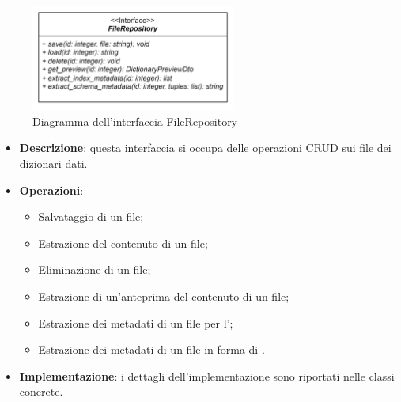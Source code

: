 \label{FileRepository}
\begin{figure}[H]
    \centering
    \includegraphics[width=0.6\textwidth]{assets/Backend/file_repository.png}
    \caption{Diagramma dell'interfaccia FileRepository}
  \end{figure}
\begin{itemize}
  \item \textbf{Descrizione}: questa interfaccia si occupa delle operazioni CRUD sui file dei dizionari dati.
  \item \textbf{Operazioni}: 
    \begin{itemize}
      \item Salvataggio di un file;
      \item Estrazione del contenuto di un file;
      \item Eliminazione di un file;
      \item Estrazione di un'anteprima del contenuto di un file;
      \item Estrazione dei metadati di un file per l';
      \item Estrazione dei metadati di un file in forma di .
    \end{itemize}
  \item \textbf{Implementazione}: i dettagli dell'implementazione sono riportati nelle classi concrete.
\end{itemize} 